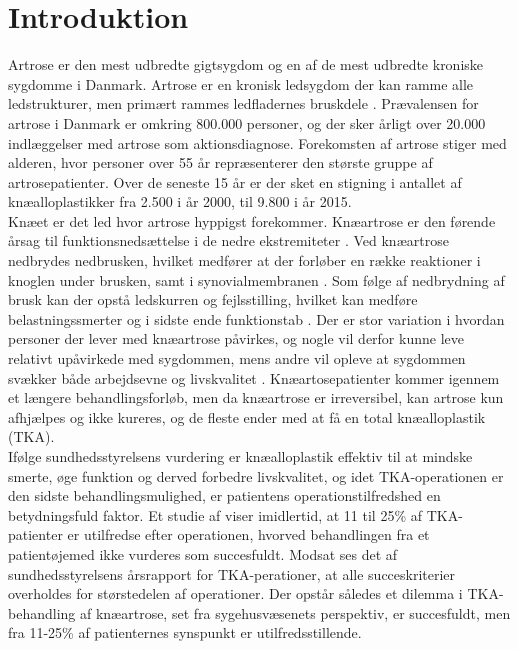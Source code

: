 
\raggedbottom


\frontmatter
 \clearpage
\mainmatter
\chapter{Introduktion}\vspace{-0.75cm}
Artrose er den mest udbredte gigtsygdom og en af de mest udbredte kroniske sygdomme i Danmark. 
Artrose er en kronisk ledsygdom der kan ramme alle ledstrukturer, men primært rammes ledfladernes bruskdele \citep{schroder}. Prævalensen for artrose i Danmark er omkring 800.000 personer, og der sker årligt over 20.000 indlæggelser med artrose som aktionsdiagnose. \citep{sygdom}
Forekomsten af artrose stiger med alderen, hvor personer over 55 år repræsenterer den største gruppe af artrosepatienter. Over de seneste 15 år er der sket en stigning i antallet af knæalloplastikker fra 2.500 i år 2000, til 9.800 i år 2015. \citep{aarsrapport2016} \\
Knæet er det led hvor artrose  hyppigst forekommer. Knæartrose er den førende årsag til funktionsnedsættelse i de nedre ekstremiteter \citep{bezwick2012}. 
Ved knæartrose nedbrydes nedbrusken, hvilket medfører at der forløber en række reaktioner i knoglen under brusken, samt i synovialmembranen \citep{brostrom2012}. Som følge af nedbrydning af brusk kan der opstå ledskurren og fejlsstilling, hvilket kan medføre belastningssmerter og i sidste ende funktionstab \citep{ugeskrift2011}.
Der er stor variation i hvordan personer der lever med knæartrose påvirkes, og nogle vil derfor kunne leve relativt upåvirkede med sygdommen, mens andre vil opleve at sygdommen svækker både arbejdsevne og livskvalitet \citep{sygdom}. Knæartosepatienter kommer igennem et længere behandlingsforløb, men da knæartrose er irreversibel, kan artrose kun afhjælpes og ikke kureres, og de fleste ender med at få en total knæalloplastik (TKA). \citep{brostrom2012} \\ 
Ifølge sundhedsstyrelsens vurdering er knæalloplastik effektiv til at mindske smerte, øge funktion og derved forbedre livskvalitet, og idet TKA-operationen er den sidste behandlingsmulighed, er patientens operationstilfredshed en betydningsfuld faktor. %
Et studie af  viser imidlertid, at 11 til 25\% af TKA-patienter er utilfredse efter operationen, hvorved behandlingen fra et patientøjemed ikke vurderes som succesfuldt.
Modsat ses det af sundhedsstyrelsens årsrapport for TKA-perationer, at alle succeskriterier overholdes for størstedelen af operationer. \citep{aarsrapport2016} 
Der opstår således et dilemma i TKA-behandling af knæartrose, set fra sygehusvæsenets perspektiv, er succesfuldt, men fra 11-25\% af patienternes synspunkt er utilfredsstillende.

